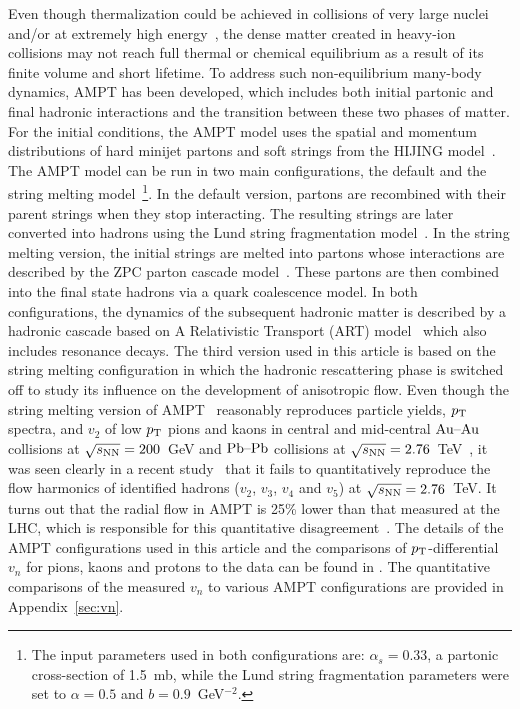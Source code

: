 Even though thermalization could be achieved in collisions of very large nuclei and/or at extremely high energy~\cite{Kurkela:2015qoa}, the dense matter created in heavy-ion collisions may not reach full thermal or chemical equilibrium as a result of its finite volume and short lifetime. To address such non-equilibrium many-body dynamics, AMPT has been developed, which includes both initial partonic and final hadronic interactions and the transition between these two phases of matter.
For the initial conditions, the AMPT model uses the spatial and momentum distributions of hard minijet partons and soft strings from the HIJING model~\cite{Wang:1991hta,Gyulassy:1994ew}.
The AMPT model can be run in two main configurations, the default and the string melting model~\footnote{The input parameters used in both configurations are: $\alpha_s = 0.33$, a partonic cross-section of 1.5~mb, while the Lund string fragmentation parameters were set to $\alpha = 0.5$ and $b = 0.9$~GeV$^{-2}$.}.
In the default version, partons are recombined with their parent strings when they stop interacting. The resulting strings are later converted into hadrons using the Lund string fragmentation model~\cite{Andersson:1986gw,NilssonAlmqvist:1986rx}. In the string melting version, the initial strings are melted into partons whose interactions are described by the ZPC parton cascade model~\cite{Zhang:1997ej}. These partons are then combined into the final state hadrons via a quark coalescence model. 
In both configurations, the dynamics of the subsequent hadronic matter is described by a hadronic cascade based on A Relativistic Transport (ART) model~\cite{Li:2001xh} which also includes resonance decays.
The third version used in this article is based on the string melting configuration in which the hadronic rescattering phase is switched off to study its influence on the development of anisotropic flow. 
Even though the string melting version of AMPT~\cite{Lin:2001zk,Lin:2004en} reasonably reproduces particle yields, $p_{\rm T}$ spectra, and $v_2$ of low $p_{\rm T}$ pions and kaons in central and mid-central $\textnormal{Au--Au}$ collisions at $\sqrt{s_{\textnormal{NN}}}=200$~GeV and $\textnormal{Pb--Pb}$ collisions at $\sqrt{s_{\textnormal{NN}}}=2.76$~TeV~\cite{Lin:2014tya}, it was seen clearly in a recent study~\cite{Adam:2016nfo} that it fails to quantitatively reproduce the flow harmonics of identified hadrons ($v_2$, $v_3$, $v_4$ and $v_5$) at $\sqrt{s_{\textnormal{NN}}}=2.76$~TeV. It turns out that the radial flow in AMPT is 25\% lower than that measured at the LHC, which is responsible for this quantitative disagreement~\cite{Adam:2016nfo}. The details of the AMPT configurations used in this article and the comparisons of $p_{\rm T}$-differential $v_{n}$ for pions, kaons and protons to the data can be found in \cite{Adam:2016nfo}. The quantitative comparisons of the measured $v_n$ to various AMPT configurations are provided in Appendix~\ref{sec:vn}.

